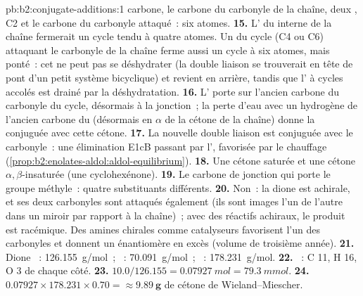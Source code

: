 \begin{solution}{pb:b2:conjugate-additions:1}
carbone, le carbone du carbonyle de la chaîne, deux , C2 et le carbone du carbonyle attaqué~: six atomes.
\textbf{15.} L' du  interne de la chaîne fermerait un cycle tendu à quatre atomes. Un 
du cycle (C4 ou C6) attaquant le carbonyle de la chaîne ferme aussi un cycle à six atomes, mais ponté~: cet
 ne peut pas se déshydrater (la double liaison se trouverait en tête de pont d'un petit système
bicyclique) et revient en arrière, tandis que l' à cycles accolés est drainé par la déshydratation.
\textbf{16.} L' porte  sur l'ancien carbone du carbonyle du cycle, désormais à la jonction~; la
perte d'eau avec un hydrogène de l'ancien carbone du  (désormais en $\alpha$ de la cétone de la
chaîne) donne la  conjuguée avec cette cétone.
\textbf{17.} La nouvelle double liaison est conjuguée avec le carbonyle~: une élimination E1cB passant par
l', favorisée par le chauffage (\cref{prop:b2:enolates-aldol:aldol-equilibrium}).
\textbf{18.} Une cétone saturée et une cétone $\alpha,\beta$-insaturée (une cyclohexénone).
\textbf{19.} Le carbone de jonction qui porte le groupe méthyle~: quatre substituants différents.
\textbf{20.} Non~: la dione est achirale, et ses deux carbonyles sont attaqués également (ils sont images
l'un de l'autre dans un miroir par rapport à la chaîne)~; avec des réactifs achiraux, le produit est
racémique. Des amines chirales comme catalyseurs favorisent l'un des carbonyles et donnent un
énantiomère en excès (volume de troisième année).
\textbf{21.} Dione ~: \qty{126.155}{g/mol}~; ~: \qty{70.091}{g/mol}~; ~:
\qty{178.231}{g/mol}.
\textbf{22.} ~: C 11, H 16, O 3 de chaque côté.
\textbf{23.} $10.0/126.155 = \qty{0.07927}{mol} = \qty{79.3}{mmol}$.
\textbf{24.} $0.07927 \times 178.231 \times 0.70 = \boldsymbol{\approx \qty{9.89}{g}}$ de
cétone de Wieland--Miescher.
\end{solution}
